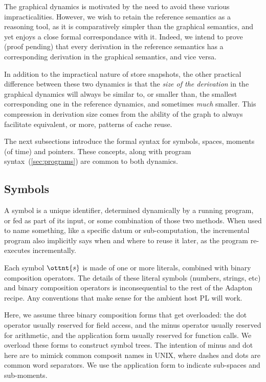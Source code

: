 \documentclass[11pt]{article}
\begin{document}
%
The graphical dynamics is motivated by the need to avoid these various
impracticalities.
%
However, we wish to retain the reference semantics as a reasoning tool,
as it is comparatively simpler than the graphical semantics,
and yet enjoys a close formal correspondance with it.
%
Indeed, we intend to prove (proof pending) that every derivation in
the reference semantics has a corresponding derivation in the
graphical semantics, and vice versa.

In addition to the impractical nature of store snapshots, the other practical
difference between these two dynamics is that the \emph{size of the
derivation} in the graphical dynamics will always be similar to, or
smaller than, the smallest corresponding one in the reference
dynamics, and sometimes \emph{much} smaller.
%
This compression in derivation size comes from the ability of the
graph to always facilitate equivalent, or more, patterns of cache reuse.

The next subsections introduce the formal syntax for symbols, spaces, moments (of time) and pointers.
%
These concepts, along with program syntax~(\cref{sec:programs}) are common to both dynamics.

\subsection{Symbols}
\label{sec:symbols}

A symbol is a
unique identifier, determined dynamically by a running program, or fed
as part of its input, or some combination of those two methods.
%
When used to name something, like a specific datum or sub-computation,
the incremental program also implicitly says when and where to reuse
it later, as the program re-executes incrementally.

\ottgrammartabular{
  \otts
}

Each symbol $\ottnt{s}$ is made of one or more literals,
combined with binary composition operators.
%
The details of these literal symbols (numbers, strings, etc) and
binary composition operators is inconsequential to the rest of the
Adapton recipe.  Any conventions that make sense for the ambient host PL will work.

Here, we assume three binary composition forms that get overloaded: the
dot operator usually reserved for field access, and the minus operator
usually reserved for arithmetic, and the application form usually reserved for function calls.
%
We overload these forms to construct symbol trees.
%
The intention of minus and dot here are to mimick common composit
names in UNIX, where dashes and dots are common word separators.
%
We use the application form to indicate sub-spaces and sub-moments.
\end{document}

